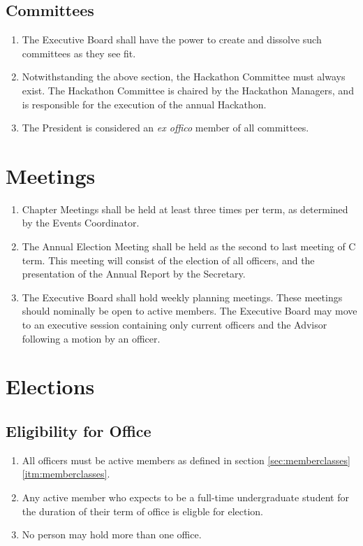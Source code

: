 \documentclass[12pt, letterpaper, oneside]{book}
\begin{document}
\section{Committees}
\begin{enumerate}
    \item The Executive Board shall have the power to create and dissolve such
        committees as they see fit.
    \item Notwithstanding the above section, the Hackathon Committee must always
        exist. The Hackathon Committee is chaired by the Hackathon Managers, and
        is responsible for the execution of the annual Hackathon.
    \item The President is considered an \emph{ex offico} member of all
        committees.
\end{enumerate}

\chapter{Meetings}
\begin{enumerate}
    \item Chapter Meetings shall be held at least three times per term, as
        determined by the Events Coordinator.
    \item The Annual Election Meeting shall be held as the second to last
        meeting of C term. This meeting will consist of the election of all
        officers, and the presentation of the Annual Report by the Secretary.
    \item The Executive Board shall hold weekly planning meetings. These
        meetings should nominally be open to active members.
        \subitem The Executive Board may move to an executive session containing
        only current officers and the Advisor following a motion by an officer.
\end{enumerate}

\chapter{Elections}
\section{Eligibility for Office}
\begin{enumerate}
    \item All officers must be active members as defined in
        section \cref{sec:memberclasses} \cref{itm:memberclasses}.
    \item Any active member who expects to be a full-time undergraduate student
        for the duration of their term of office is eligble for election.
    \item No person may hold more than one office.
\end{enumerate}
\end{document}
